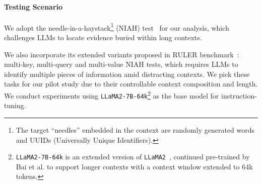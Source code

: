 \paragraph{Testing Scenario}
We adopt the needle-in-a-haystack\footnote{The target ``needles'' embedded in the context are randomly generated words and UUIDs (Universally Unique Identifiers).} (NIAH) test~\cite{kamradt2023needle} for our analysis, which challenges LLMs to locate evidence buried within long contexts.
\begingroup
\renewcommand{\arraystretch}{1.1}
\begin{table}[ht]
\centering
{}
\caption{Overview of instruction-tuning configurations for experiments in Figure~\ref{fig:niah}. The context in context-aware instruction data consists of two parts: relevant context (a sentence containing the target UUID, usually called "needle") and irrelevant context (an essay serving as distractive information, usually called "haystack"). We present the data format for these tasks in Appendix~\ref{sec:niah-data-format}.}
\label{tab:explanation}
\end{table}
\endgroup
We also incorporate its extended variants proposed in \textsc{RULER} benchmark~\cite{hsieh2024ruler}: multi-key, multi-query and multi-value NIAH tests, which requires LLMs to identify multiple pieces of information amid distracting contexts.
We pick these tasks for our pilot study due to their controllable context composition and length. %
We conduct experiments using \texttt{LLaMA2-7B-64k}\footnote{\texttt{LLaMA2-7B-64k} is an extended version of \texttt{LLaMA2}~\cite{touvron2023llama2}, continued pre-trained by Bai et al. to support longer contexts with a context window extended to 64k tokens.} as the base model for instruction-tuning.

